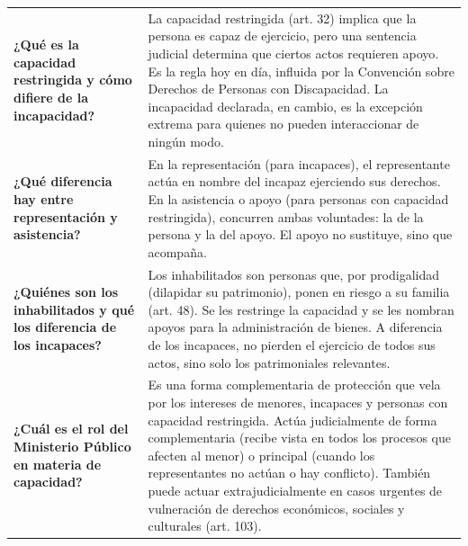 \documentclass[12pt,oneside]{book}
\begin{document}
\begin{longtable}{
    >{\raggedright\arraybackslash}p{}
    >{\raggedright\arraybackslash}p{}
}
\textbf{¿Qué es la capacidad restringida y cómo difiere de la incapacidad?} &
La capacidad restringida (art. 32) implica que la persona es capaz de ejercicio, pero una sentencia judicial determina que ciertos actos requieren apoyo. Es la regla hoy en día, influida por la Convención sobre Derechos de Personas con Discapacidad. La incapacidad declarada, en cambio, es la excepción extrema para quienes no pueden interaccionar de ningún modo. \\

\textbf{¿Qué diferencia hay entre representación y asistencia?} &
En la representación (para incapaces), el representante actúa en nombre del incapaz ejerciendo sus derechos. En la asistencia o apoyo (para personas con capacidad restringida), concurren ambas voluntades: la de la persona y la del apoyo. El apoyo no sustituye, sino que acompaña. \\

\textbf{¿Quiénes son los inhabilitados y qué los diferencia de los incapaces?} &
Los inhabilitados son personas que, por prodigalidad (dilapidar su patrimonio), ponen en riesgo a su familia (art. 48). Se les restringe la capacidad y se les nombran apoyos para la administración de bienes. A diferencia de los incapaces, no pierden el ejercicio de todos sus actos, sino solo los patrimoniales relevantes. \\

\textbf{¿Cuál es el rol del Ministerio Público en materia de capacidad?} &
Es una forma complementaria de protección que vela por los intereses de menores, incapaces y personas con capacidad restringida. Actúa judicialmente de forma complementaria (recibe vista en todos los procesos que afecten al menor) o principal (cuando los representantes no actúan o hay conflicto). También puede actuar extrajudicialmente en casos urgentes de vulneración de derechos económicos, sociales y culturales (art. 103). \\

\midrule


\end{longtable}
\end{document}

